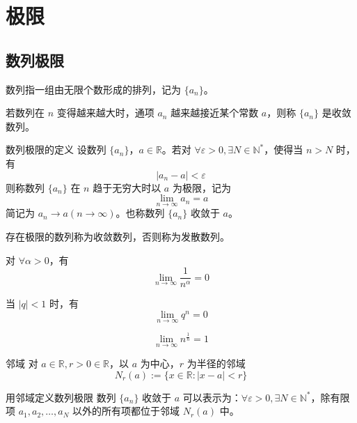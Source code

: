 \chapter{极限}


\section{数列极限}

数列指一组由无限个数形成的排列，记为 $\{a_n\}$。

若数列在 $n$ 变得越来越大时，通项 $a_n$ 越来越接近某个常数 $a$，则称 $\{a_n\}$ 是收敛数列。

\begin{definition}{数列极限的定义}
    设数列 $\{a_n\}$，$a \in \mathbb{R}$。若对 $\forall \varepsilon > 0, \exists N \in \mathbb{N}^*$，使得当 $n > N$ 时，有
    \[|a_n - a| < \varepsilon\]
    则称数列 $\{a_n\}$ 在 $n$ 趋于无穷大时以 $a$ 为极限，记为
    \[\lim_{n \to \infty} a_n = a\]
    简记为 $a_n \to a(n \to \infty)$。也称数列 $\{a_n\}$ 收敛于 $a$。

    存在极限的数列称为收敛数列，否则称为发散数列。
\end{definition}

\hfill

\begin{example}
    对 $\forall \alpha > 0$，有
    \[\lim_{n \to \infty}\frac{1}{n^{\alpha}} = 0\]
\end{example}

\hfill

\begin{example}
    当 $|q| < 1$ 时，有
    \[\lim_{n \to \infty}q^n = 0\]
\end{example}

\hfill

\begin{example}
    \[\lim_{n \to \infty}n^{\frac{1}{n}} = 1\]
\end{example}

\hfill

\begin{definition}{邻域}
    对 $a \in \mathbb{R}, r > 0 \in \mathbb{R}$，以 $a$ 为中心，$r$ 为半径的邻域
    \[N_r(a) := \{ x \in \mathbb{R} : |x - a| < r\}\]
\end{definition}

\begin{definition}{用邻域定义数列极限}
    数列 $\{a_n\}$ 收敛于 $a$ 可以表示为：$\forall \varepsilon > 0,\exists N \in \mathbb{N}^*$，除有限项 $a_1,a_2, \ldots ,a_N$ 以外的所有项都位于邻域 $N_r(a)$ 中。
\end{definition}

